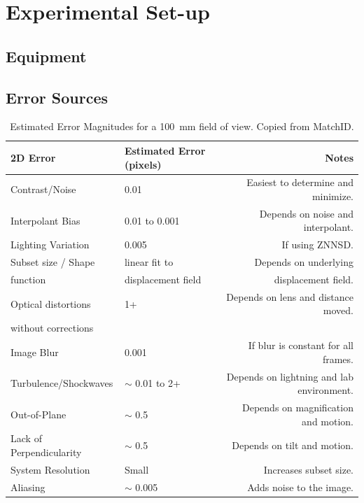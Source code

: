 \documentclass{article}
\begin{document}
\clearpage
\section{Experimental Set-up}

\subsection{Equipment}

\subsection{Error Sources}

\begin{table}[htbp]
\caption{Estimated Error Magnitudes for a \SI{100}{\milli\metre} field of view. Copied from MatchID.}
\label{tab:esterrmagn}
\begin{tabular}{@{}llr@{}} \toprule
2D Error	& Estimated Error (pixels)	& Notes \\ \midrule 
Contrast/Noise & 0.01 & Easiest to determine and minimize. \\
Interpolant Bias & 0.01 to 0.001 & Depends on noise and interpolant. \\
Lighting Variation & 0.005 & If using ZNNSD. \\
Subset size / Shape & linear fit to  &  Depends on underlying \\
 \hspace{.3cm} function & displacement field & displacement field.  \\
Optical distortions & 1+ & Depends on lens and distance moved.\\
 \hspace{.3cm} without corrections	&	& \\
Image Blur	& 0.001 & If blur is constant for all frames.\\
Turbulence/Shockwaves & $\sim$ 0.01 to 2+ & Depends on lightning and lab environment. \\
Out-of-Plane	& $\sim$ 0.5	& Depends on magnification and motion. \\
Lack of Perpendicularity	& $\sim$ 0.5	& Depends on tilt and motion. \\
System Resolution	& Small	& Increases subset size.\\
Aliasing	& $\sim$ 0.005	& Adds noise to the image.\\ \bottomrule
\end{tabular}
\end{table}
\end{document}
